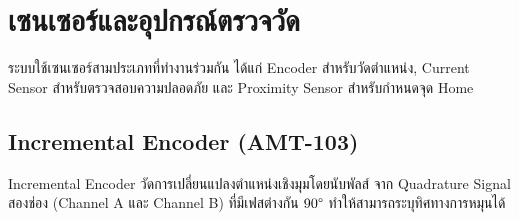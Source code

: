 
\section{เซนเซอร์และอุปกรณ์ตรวจวัด}
\label{sec:sensors}
 
ระบบใช้เซนเซอร์สามประเภทที่ทำงานร่วมกัน
ได้แก่ Encoder สำหรับวัดตำแหน่ง, Current Sensor สำหรับตรวจสอบความปลอดภัย
และ Proximity Sensor สำหรับกำหนดจุด Home
 
\subsection{Incremental Encoder (AMT-103)}
\label{subsec:encoder_theory}
 
Incremental Encoder วัดการเปลี่ยนแปลงตำแหน่งเชิงมุมโดยนับพัลส์
จาก Quadrature Signal สองช่อง (Channel A และ Channel B)
ที่มีเฟสต่างกัน $90\degree$ ทำให้สามารถระบุทิศทางการหมุนได้
 
